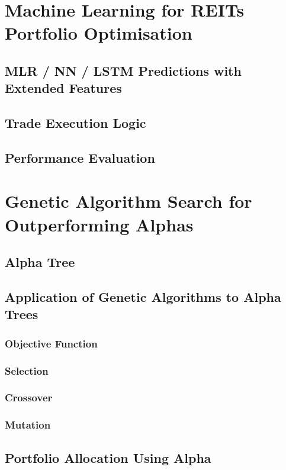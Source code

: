 \documentclass[a4paper,12pt]{report}
\numberwithin{equation}{section}
\theoremstyle{definition}
\begin{document}


\section{Machine Learning for REITs Portfolio Optimisation}
\subsection{MLR / NN / LSTM Predictions with Extended Features}
\subsection{Trade Execution Logic}
\subsection{Performance Evaluation}
\section{Genetic Algorithm Search for Outperforming Alphas}
\subsection{Alpha Tree}
\subsection{Application of Genetic Algorithms to Alpha Trees}
\subsubsection{Objective Function}
\subsubsection{Selection}
\subsubsection{Crossover}
\subsubsection{Mutation}
\subsection{Portfolio Allocation Using Alpha}
\end{document}
